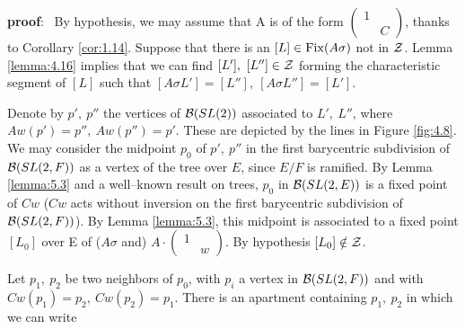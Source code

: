 \documentclass[12pt,letterpaper]{article}
\def\bbb{{\cal B}}
\def\zz{{\cal Z}}
\def\pf{{\bf proof}:\ }
\begin{document}
\pf 
By hypothesis, we may assume that A is of the form
$\left(\begin{array}{cc} 1 &\ \\ \ &C\end{array}\right)$, 
thanks to Corollary \ref{cor:1.14}.
Suppose that there is an $[L]\in {\rm Fix}(A\sigma )$ not in $\zz$. 
Lemma \ref{lemma:4.16}
implies that we can find $[L'],\ [L'']\in\zz$ forming the characteristic
segment of $[L]$ such that
$[A\sigma L'] = [L''],\ [A\sigma L''] = [L']$. 

Denote by $p',\ p''$
the vertices of $\bbb (SL(2))$ associated to $L',\ L''$,
where $Aw(p')=p'',\ Aw(p'')=p'$.
These are depicted by the lines in Figure \ref{fig:4.8}.
We may consider the midpoint $p_0$ of $p',\ p''$ in the first barycentric
subdivision of $\bbb (SL(2,F))$ as a vertex of the tree over $E$, since
$E/F$ is ramified. By Lemma \ref{lemma:5.3} and a
well--known result on trees, $p_0$ in $\bbb (SL(2,E))$ is a fixed point
of $Cw$ ($Cw$ acts without inversion on the first barycentric subdivision
of $\bbb (SL(2,F))$). By Lemma \ref{lemma:5.3}, this midpoint
is associated to a fixed point $[L_0]$ over E of ($A\sigma$ and)
$A\cdot\left(\begin{array}{cc}
1&\ \\\ &w\end{array}\right)$. By hypothesis 
$[L_0]\notin \zz$.
 
Let
$p_1,\ p_2$ be two neighbors of $p_0$, with $p_i$ a vertex in
$\bbb (SL(2,F))$ and with $Cw(p_1)=p_2,\ Cw(p_2)=p_1$. There is an
apartment containing $p_1,\ p_2$ in which we can write
\end{document}
